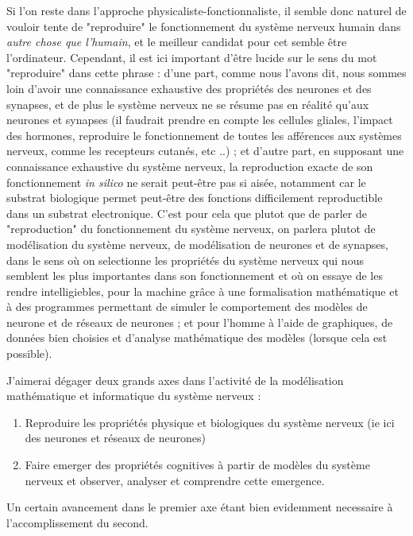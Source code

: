 \documentclass[12pt]{scrartcl}
\begin{document}
	Si l'on reste dans l'approche physicaliste-fonctionnaliste, il semble donc naturel de vouloir tente de "reproduire" le fonctionnement du système nerveux humain dans \textit{autre chose que l'humain}, et le meilleur candidat pour cet  semble être l'ordinateur. Cependant, il est ici important d'être lucide sur le sens du mot "reproduire" dans cette phrase : d'une part, comme nous l'avons dit, nous sommes loin d'avoir une connaissance exhaustive des propriétés des neurones et des synapses, et de plus le système nerveux ne se résume pas en réalité qu'aux neurones et synapses (il faudrait prendre en compte les cellules gliales, l'impact des hormones, reproduire le fonctionnement de toutes les afférences aux systèmes nerveux, comme les recepteurs cutanés, etc ..) ; et d'autre part, en supposant une connaissance exhaustive du système nerveux, la reproduction exacte de son fonctionnement \textit{in silico} ne serait peut-être pas si aisée, notamment car le substrat biologique permet peut-être des fonctions difficilement reproductible dans un substrat electronique. C'est pour cela que plutot que de parler de "reproduction" du fonctionnement du système nerveux, on parlera plutot de modélisation du système nerveux, de modélisation de neurones et de synapses, dans le sens où on selectionne les propriétés du système nerveux qui nous semblent les plus importantes dans son fonctionnement et où on essaye de les rendre intelligiebles, pour la machine grâce à une formalisation mathématique et à des programmes permettant de simuler le comportement des modèles de neurone et de réseaux de neurones ; et pour l'homme à l'aide de graphiques, de données bien choisies et d'analyse mathématique des modèles (lorsque cela est possible).
	
	J'aimerai dégager deux grands axes dans l'activité de la modélisation mathématique et informatique du système nerveux :
	\begin{enumerate} \item Reproduire les propriétés physique et biologiques du système nerveux (ie ici des neurones et réseaux de neurones) 
	\item Faire emerger des propriétés cognitives à partir de modèles du système nerveux et observer, analyser et comprendre cette emergence. \end{enumerate}

	Un certain avancement dans le premier axe étant bien evidemment necessaire à l'accomplissement du second.
\end{document}
